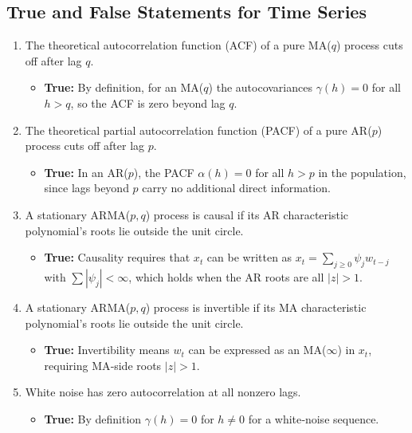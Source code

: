 \documentclass[11pt]{article}
\begin{document}
\subsection{True and False Statements for Time Series}
\begin{enumerate}
  \item The theoretical autocorrelation function (ACF) of a pure MA($q$) process cuts off after lag $q$.
  \begin{itemize}
    \item \textbf{True:}  By definition, for an MA($q$) the autocovariances $\gamma(h)=0$ for all $h>q$, so the ACF is zero beyond lag $q$.
  \end{itemize}

  \item The theoretical partial autocorrelation function (PACF) of a pure AR($p$) process cuts off after lag $p$.
  \begin{itemize}
    \item \textbf{True:}  In an AR($p$), the PACF $\alpha(h)=0$ for all $h>p$ in the population, since lags beyond $p$ carry no additional direct information.
  \end{itemize}

  \item A stationary ARMA($p,q$) process is causal if its AR characteristic polynomial’s roots lie outside the unit circle.
  \begin{itemize}
    \item \textbf{True:}  Causality requires that $x_t$ can be written as $x_t=\sum_{j\ge0}\psi_j w_{t-j}$ with $\sum|\psi_j|<\infty$, which holds when the AR roots are all $|z|>1$.
  \end{itemize}

  \item A stationary ARMA($p,q$) process is invertible if its MA characteristic polynomial’s roots lie outside the unit circle.
  \begin{itemize}
    \item \textbf{True:}  Invertibility means $w_t$ can be expressed as an MA($\infty$) in $x_t$, requiring MA‐side roots $|z|>1$.
  \end{itemize}

  \item White noise has zero autocorrelation at all nonzero lags.
  \begin{itemize}
    \item \textbf{True:}  By definition $\gamma(h)=0$ for $h\neq0$ for a white‐noise sequence.
  \end{itemize}


\end{enumerate}
\end{document}

